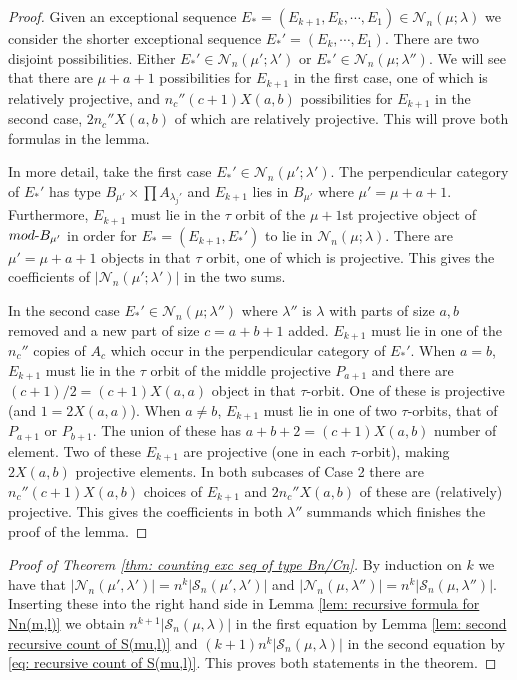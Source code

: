 \documentclass[11pt]{amsart}
\theoremstyle{definition}
\theoremstyle{remark}
\numberwithin{equation}{section}
\newcommand{\cN}{\ensuremath{{\mathcal{N}}}}
\newcommand{\cS}{\ensuremath{{\mathcal{S}}}}
\begin{document}
\begin{proof}
Given an exceptional sequence $E_\ast=(E_{k+1},E_k,\cdots,E_1)\in \cN_n(\mu;\lambda)$ we consider the shorter exceptional sequence $E_\ast'=(E_k,\cdots,E_1)$. There are two disjoint possibilities. Either $E_\ast'\in \cN_n(\mu';\lambda')$ or $E_\ast'\in \cN_n(\mu;\lambda'')$. We will see that there are $\mu+a+1$ possibilities for $E_{k+1}$ in the first case, one of which is relatively projective, and $n_c''(c+1)X(a,b)$ possibilities for $E_{k+1}$ in the second case, $2n_c''X(a,b)$ of which are relatively projective. This will prove both formulas in the lemma.

In more detail, take the first case $E_\ast'\in \cN_n(\mu';\lambda')$. The perpendicular category of $E_\ast'$ has type $B_{\mu'}\times \prod A_{\lambda_j'}$ and $E_{k+1}$ lies in $B_{\mu'}$ where $\mu'=\mu+a+1$. Furthermore, $E_{k+1}$ must lie in the $\tau$ orbit of the $\mu+1$st projective object of $mod\text-B_{\mu'}$ in order for $E_\ast=(E_{k+1},E_\ast')$ to lie in $\cN_n(\mu;\lambda)$. There are $\mu'=\mu+a+1$ objects in that $\tau$ orbit, one of which is projective. This gives the coefficients of $|\cN_n(\mu';\lambda')|$ in the two sums.

In the second case $E_\ast'\in \cN_n(\mu;\lambda'')$ where $\lambda''$ is $\lambda$ with parts of size $a,b$ removed and a new part of size $c=a+b+1$ added. $E_{k+1}$ must lie in one of the $n_c''$ copies of $A_c$ which occur in the perpendicular category of $E_\ast'$. When $a=b$, $E_{k+1}$ must lie in the $\tau$ orbit of the middle projective $P_{a+1}$ and there are $(c+1)/2=(c+1)X(a,a)$ object in that $\tau$-orbit. One of these is projective (and $1=2X(a,a)$). When $a\neq b$, $E_{k+1}$ must lie in one of two $\tau$-orbits, that of $P_{a+1}$ or $P_{b+1}$. The union of these has $a+b+2=(c+1)X(a,b)$ number of element. Two of these  $E_{k+1}$ are projective (one in each $\tau$-orbit), making $2X(a,b)$ projective elements. In both subcases of Case 2 there are $n_c''(c+1)X(a,b)$ choices of $E_{k+1}$ and $2n_c''X(a,b)$ of these are (relatively) projective. This gives the coefficients in both $\lambda''$ summands which finishes the proof of the lemma.
\end{proof}

\begin{proof}[Proof of Theorem \ref{thm: counting exc seq of type Bn/Cn}]
    By induction on $k$ we have that $|\cN_n(\mu',\lambda')|=n^k|\cS_n(\mu',\lambda')|$ and $|\cN_n(\mu,\lambda'')|=n^k|\cS_n(\mu,\lambda'')|$. Inserting these into the right hand side in Lemma \ref{lem: recursive formula for Nn(m,l)} we obtain $n^{k+1}|\cS_n(\mu,\lambda)|$ in the first equation by Lemma \ref{lem: second recursive count of S(mu,l)} and $(k+1)n^k|\cS_n(\mu,\lambda)|$ in the second equation by \eqref{eq: recursive count of S(mu,l)}. This proves both statements in the theorem.
\end{proof}
\end{document}
